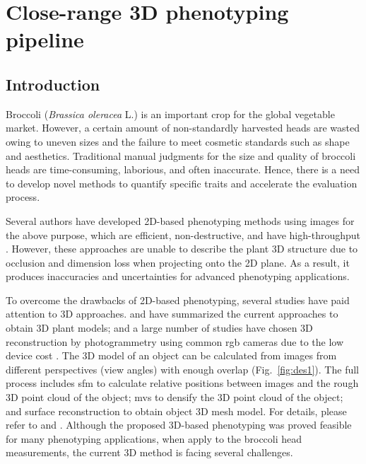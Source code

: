 \chapter{Close-range 3D phenotyping pipeline}

\section{Introduction}


Broccoli (\textit{Brassica oleracea} L.) is an important crop for the global vegetable market. However, a certain amount of non-standardly harvested heads are wasted owing to uneven sizes and the failure to meet cosmetic standards such as shape and aesthetics. Traditional manual judgments for the size and quality of broccoli heads are time-consuming, laborious, and often inaccurate. Hence, there is a need to develop novel methods to quantify specific traits and accelerate the evaluation process.

Several authors have developed 2D-based phenotyping methods using images for the above purpose, which are efficient, non-destructive, and have high-throughput \citep{yang_greenness_2015,guo_easypcc_2017,zou_broccoli_2019}. However, these approaches are unable to describe the plant 3D structure due to occlusion and dimension loss when projecting onto the 2D plane. As a result, it produces inaccuracies and uncertainties for advanced phenotyping applications.

To overcome the drawbacks of 2D-based phenotyping, several studies have paid attention to 3D approaches. \citet{paulus_measuring_2019} and \citet{kochi_introduction_2021} have summarized the current approaches to obtain 3D plant models; and a large number of studies have chosen 3D reconstruction by photogrammetry using common \gls{rgb} cameras due to the low device cost \citep{xiao_estimating_2021,zermas_3d_2020,zhang_estimating_2016}. The 3D model of an object can be calculated from images from different perspectives (view angles) with enough overlap (Fig.~\ref{fig:des1}). The full process includes \gls{sfm} to calculate relative positions between images and the rough 3D point cloud of the object; \gls{mvs} to densify the 3D point cloud of the object; and surface reconstruction to obtain object 3D mesh model. For details, please refer to \citet{hartley_multiple_2000} and \citet{snavely_scene_2010}. Although the proposed 3D-based phenotyping was proved feasible for many phenotyping applications, when apply to the broccoli head measurements, the current 3D method is facing several challenges.

